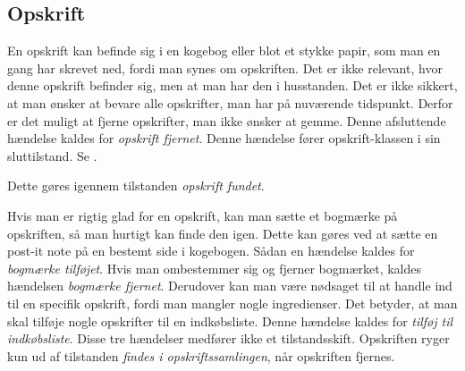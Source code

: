 \subsection{Opskrift}
En opskrift kan befinde sig i en kogebog eller blot et stykke papir, som man en gang har skrevet ned, fordi man synes om opskriften. Det er ikke relevant, hvor denne opskrift befinder sig, men at man har den i husstanden. Det er ikke sikkert, at man ønsker at bevare alle opskrifter, man har på nuværende tidspunkt. Derfor er det muligt at fjerne opskrifter, man ikke ønsker at gemme. Denne afsluttende hændelse kaldes for \textit{opskrift fjernet}. Denne hændelse fører opskrift-klassen i sin sluttilstand. Se .

 Dette gøres igennem tilstanden \textit{opskrift fundet}.

Hvis man er rigtig glad for en opskrift, kan man sætte et bogmærke på opskriften, så man hurtigt kan finde den igen. Dette kan \fx gøres ved at sætte en post-it note på en bestemt side i kogebogen. Sådan en hændelse kaldes for \textit{bogmærke tilføjet}. Hvis man ombestemmer sig og fjerner bogmærket, kaldes hændelsen \textit{bogmærke fjernet}. Derudover kan man være nødsaget til at handle ind til en specifik opskrift, fordi man mangler nogle ingredienser. Det betyder, at man skal tilføje nogle opskrifter til en indkøbsliste. Denne hændelse kaldes for \textit{tilføj til indkøbsliste}. Disse tre hændelser medfører ikke et tilstandsskift. Opskriften ryger kun ud af tilstanden \textit{findes i opskriftssamlingen}, når opskriften fjernes.

\begin{figure}[H]
	\centering
	\scalebox{0.8}{
	}
	\label{fig:opskrift-adfaerd}
\end{figure}	